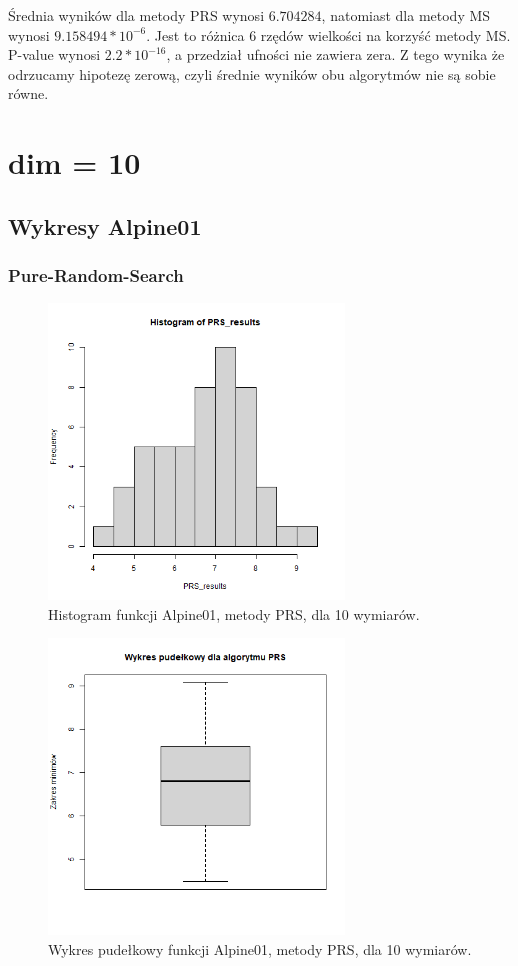 \documentclass{lab}
\begin{document}
Średnia wyników dla metody PRS wynosi $6.704284$, natomiast dla metody MS wynosi $9.158494*10^{-6}$. Jest to różnica 6 rzędów wielkości na korzyść metody MS. P-value wynosi $2.2*10^{-16}$, a przedział ufności nie zawiera zera. Z tego wynika że odrzucamy hipotezę zerową, czyli średnie wyników obu algorytmów nie są sobie równe.

\section{dim = 10}
\subsection{Wykresy Alpine01}
\subsubsection{Pure-Random-Search}
\begin{figure}[H]
  \centering
  \includegraphics[width=0.7\textwidth]{img/dim10_PRS_Alpine01_his.png}
  \caption{Histogram funkcji Alpine01, metody PRS, dla 10 wymiarów.}
\end{figure}
\begin{figure}[H]
  \centering
  \includegraphics[width=0.7\textwidth]{img/dim10_PRS_Alpine01.png}
  \caption{Wykres pudełkowy funkcji Alpine01, metody PRS, dla 10 wymiarów.}
\end{figure}
\end{document}
